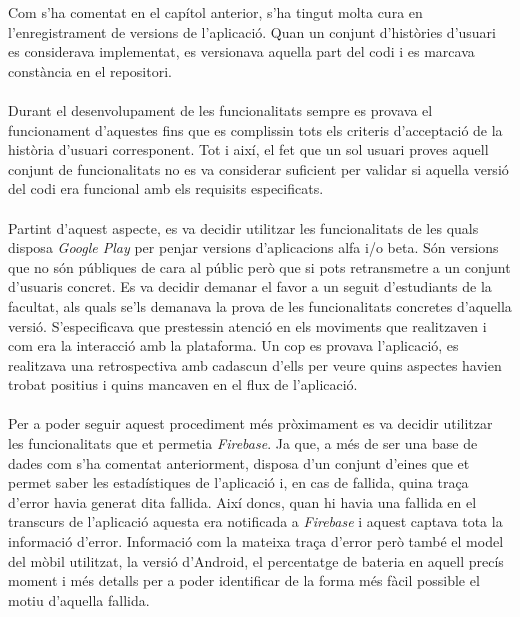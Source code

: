 Com s'ha comentat en el capítol anterior, s'ha tingut molta cura en l'enregistrament de versions de l'aplicació. Quan un conjunt d'històries d'usuari es considerava implementat, es versionava aquella part del codi i es marcava constància en el repositori.
\\\\
Durant el desenvolupament de les funcionalitats sempre es provava el funcionament d'aquestes fins que es complissin tots els criteris d'acceptació de la història d'usuari corresponent. Tot i així, el fet que un sol usuari proves aquell conjunt de funcionalitats no es va considerar suficient per validar si aquella versió del codi era funcional amb els requisits especificats.
\\\\
Partint d'aquest aspecte, es va decidir utilitzar les funcionalitats de les quals disposa \textit{Google Play} per penjar versions d'aplicacions alfa i/o beta. Són versions que no són públiques de cara al públic però que si pots retransmetre a un conjunt d'usuaris concret. Es va decidir demanar el favor a un seguit d'estudiants de la facultat, als quals se'ls demanava la prova de les funcionalitats concretes d'aquella versió. S'especificava que prestessin atenció en els moviments que realitzaven i com era la interacció amb la plataforma. Un cop es provava l'aplicació, es realitzava una retrospectiva amb cadascun d'ells per veure quins aspectes havien trobat positius i quins mancaven en el flux de l'aplicació.
\\\\
Per a poder seguir aquest procediment més pròximament es va decidir utilitzar les funcionalitats que et permetia \textit{Firebase}. Ja que, a més de ser una base de dades com s'ha comentat anteriorment, disposa d'un conjunt d'eines que et permet saber les estadístiques de l'aplicació i, en cas de fallida, quina traça d'error havia generat dita fallida. Així doncs, quan hi havia una fallida en el transcurs de l'aplicació aquesta era notificada a \textit{Firebase} i aquest captava tota la informació d'error. Informació com la mateixa traça d'error però també el model del mòbil utilitzat, la versió d'Android, el percentatge de bateria en aquell precís moment i més detalls per a poder identificar de la forma més fàcil possible el motiu d'aquella fallida.
\\
